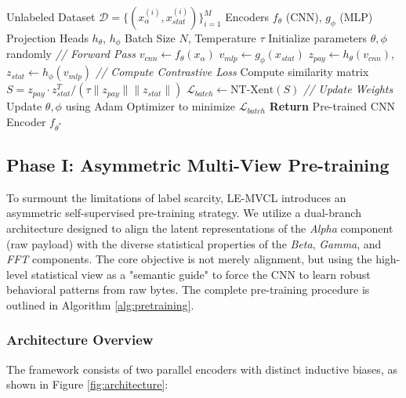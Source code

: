 \begin{algorithm}[H]
\caption{LE-MVCL Asymmetric Pre-training Strategy}
\label{alg:pretraining}
\begin{algorithmic}[1]
\REQUIRE Unlabeled Dataset $\mathcal{D} = \{ (x_{\alpha}^{(i)}, x_{stat}^{(i)}) \}_{i=1}^{M}$
\REQUIRE Encoders $f_{\theta}$ (CNN), $g_{\phi}$ (MLP)
\REQUIRE Projection Heads $h_{\theta}$, $h_{\phi}$
\REQUIRE Batch Size $N$, Temperature $\tau$
\STATE Initialize parameters $\theta, \phi$ randomly
    \STATE \textit{// Forward Pass}
    \STATE $v_{cnn} \leftarrow f_{\theta}(x_{\alpha})$ 
    \STATE $v_{mlp} \leftarrow g_{\phi}(x_{stat})$ 
    \STATE $z_{pay} \leftarrow h_{\theta}(v_{cnn})$, \quad $z_{stat} \leftarrow h_{\phi}(v_{mlp})$ 
    \STATE
    \STATE \textit{// Compute Contrastive Loss}
    \STATE Compute similarity matrix $S = z_{pay} \cdot z_{stat}^T / (\tau \|z_{pay}\| \|z_{stat}\|)$
    \STATE $\mathcal{L}_{batch} \leftarrow \text{NT-Xent}(S)$ 
    \STATE
    \STATE \textit{// Update Weights}
    \STATE Update $\theta, \phi$ using Adam Optimizer to minimize $\mathcal{L}_{batch}$
\ENDFOR
\STATE \textbf{Return} Pre-trained CNN Encoder $f_{\theta^*}$
\end{algorithmic}
\end{algorithm}

\subsection{Phase I: Asymmetric Multi-View Pre-training}
\label{subsec:phase1_contrastive}

To surmount the limitations of label scarcity, LE-MVCL introduces an asymmetric self-supervised pre-training strategy. We utilize a dual-branch architecture designed to align the latent representations of the \textit{Alpha} component (raw payload) with the diverse statistical properties of the \textit{Beta}, \textit{Gamma}, and \textit{FFT} components. The core objective is not merely alignment, but using the high-level statistical view as a "semantic guide" to force the CNN to learn robust behavioral patterns from raw bytes. The complete pre-training procedure is outlined in Algorithm \ref{alg:pretraining}.

\subsubsection{Architecture Overview}
The framework consists of two parallel encoders with distinct inductive biases, as shown in Figure \ref{fig:architecture}:

